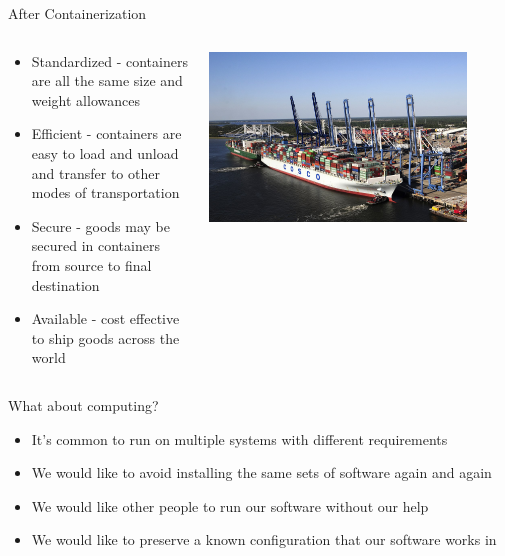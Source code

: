 \begin{frame}{After Containerization}
	\begin{columns}[c]
		\begin{column}{0.5\textwidth}
			\begin{itemize}
				\item Standardized - containers are all the same size and weight allowances
				
				\item Efficient - containers are easy to load and unload and transfer to other modes of transportation
				
				\item Secure - goods may be secured in containers from source to final destination
				
				\item Available - cost effective to ship goods across the world
			\end{itemize}
		\end{column}
		\begin{column}{0.5\textwidth}
			\centering
			\includegraphics[width=0.85\textwidth]{figures/cargo_ship}
		\end{column}
	\end{columns}
	
\end{frame}

\begin{frame}{What about computing?}
	\begin{itemize}
		\item It's common to run on multiple systems with different requirements
				
		\item We would like to avoid installing the same sets of software again and again
				
		\item We would like other people to run our software without our help
				
		\item  We would like to preserve a known configuration that our software works in
	\end{itemize}
\end{frame}

